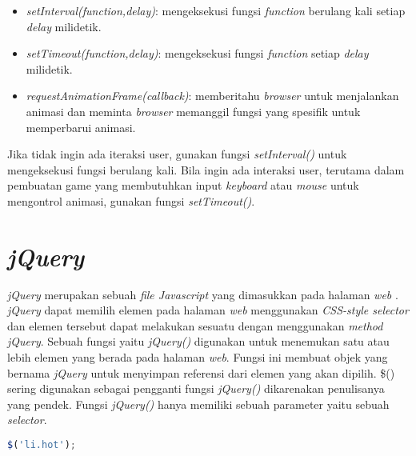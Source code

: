 \begin{itemize}
	\item \textit{setInterval(function,delay)}: mengeksekusi fungsi \textit{function} berulang kali setiap \textit{delay} milidetik.
	\item \textit{setTimeout(function,delay)}: mengeksekusi fungsi \textit{function} setiap \textit{delay} milidetik.
	\item \textit{requestAnimationFrame(callback)}: memberitahu \textit{browser} untuk menjalankan animasi dan meminta \textit{browser} memanggil fungsi yang spesifik untuk memperbarui animasi.
\end{itemize}

Jika tidak ingin ada iteraksi user, gunakan fungsi \textit{setInterval()} untuk mengeksekusi fungsi berulang kali. Bila ingin ada interaksi user, terutama dalam pembuatan game yang membutuhkan input \textit{keyboard} atau \textit{mouse} untuk mengontrol animasi, gunakan fungsi \textit{setTimeout()}.

\section{\textit{jQuery}}
\textit{jQuery} merupakan sebuah \textit{file Javascript} yang dimasukkan pada halaman \textit{web} \cite{duckett2014javascript}. \textit{jQuery} dapat memilih elemen pada halaman \textit{web} menggunakan \textit{CSS-style selector} dan elemen tersebut dapat melakukan sesuatu dengan menggunakan \textit{method jQuery}. Sebuah fungsi yaitu \textit{jQuery()} digunakan untuk menemukan satu atau lebih elemen yang berada pada halaman \textit{web}. Fungsi ini membuat objek yang bernama \textit{jQuery} untuk menyimpan referensi dari elemen yang akan dipilih. \$() sering digunakan sebagai pengganti fungsi \textit{jQuery()} dikarenakan penulisanya yang pendek. Fungsi \textit{jQuery()} hanya memiliki sebuah parameter yaitu sebuah \textit{selector}.

\begin{lstlisting}[language=Javascript, caption=Mendapatkan elemen menggunakan \textit{CSS-style selector}, label={lst:jQuery1}]
	$('li.hot');
\end{lstlisting}

